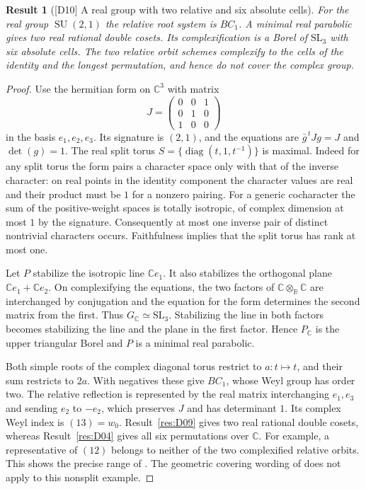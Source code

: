 \documentclass[11pt,a4paper,openany,oneside]{book}
\theoremstyle{resultstyle}
\newtheorem{statement}{Result}[chapter]
\newenvironment{result}[2]{\clubpenalty=10000\begin{statement}[\textnormal{[#1]} #2]\leavevmode\label{res:#1}\ignorespaces}{\end{statement}}
\theoremstyle{definition}
\numberwithin{equation}{chapter}
\newcommand{\SL}{\mathrm{SL}}
\newcommand{\RR}{\mathbb{R}}
\newcommand{\CC}{\mathbb{C}}
\begin{document}
\begin{result}{D10}{A real group with two relative and six absolute cells}
For the real group \(\operatorname{SU}(2,1)\) the relative root system is \(BC_1\). A minimal real parabolic gives two real rational double cosets. Its complexification is a Borel of \(\SL_3\) with six absolute cells. The two relative orbit schemes complexify to the cells of the identity and the longest permutation, and hence do not cover the complex group.
\end{result}

\begin{proof}
Use the hermitian form on \(\CC^3\) with matrix
\[
 J=\begin{pmatrix}0&0&1\\0&1&0\\1&0&0\end{pmatrix}
\]
in the basis \(e_1,e_2,e_3\). Its signature is \((2,1)\), and the equations are \(\bar g^{\,t}Jg=J\) and \(\det(g)=1\). The real split torus \(S=\{\operatorname{diag}(t,1,t^{-1})\}\) is maximal. Indeed for any split torus the form pairs a character space only with that of the inverse character: on real points in the identity component the character values are real and their product must be \(1\) for a nonzero pairing. For a generic cocharacter the sum of the positive-weight spaces is totally isotropic, of complex dimension at most \(1\) by the signature. Consequently at most one inverse pair of distinct nontrivial characters occurs. Faithfulness implies that the split torus has rank at most one.

Let \(P\) stabilize the isotropic line \(\CC e_1\). It also stabilizes the orthogonal plane \(\CC e_1+\CC e_2\). On complexifying the equations, the two factors of \(\CC\otimes_{\RR}\CC\) are interchanged by conjugation and the equation for the form determines the second matrix from the first. Thus \(G_{\CC}\simeq\SL_3\). Stabilizing the line in both factors becomes stabilizing the line and the plane in the first factor. Hence \(P_{\CC}\) is the upper triangular Borel and \(P\) is a minimal real parabolic.

Both simple roots of the complex diagonal torus restrict to \(a:t\mapsto t\), and their sum restricts to \(2a\). With negatives these give \(BC_1\), whose Weyl group has order two. The relative reflection is represented by the real matrix interchanging \(e_1,e_3\) and sending \(e_2\) to \(-e_2\), which preserves \(J\) and has determinant \(1\). Its complex Weyl index is \((13)=w_0\). Result~\ref{res:D09} gives two real rational double cosets, whereas Result~\ref{res:D04} gives all six permutations over \(\CC\). For example, a representative of \((12)\) belongs to neither of the two complexified relative orbits. This shows the precise range of \cite[Remark 10.3.2 and Appendix Q.4]{conradfeng}. The geometric covering wording of \cite[25.27]{milne} does not apply to this nonsplit example.
\end{proof}
\end{document}
